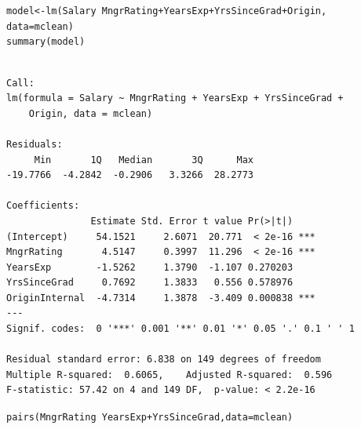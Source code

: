 \documentclass{beamer}\usepackage[]{graphicx}\usepackage[]{color}
\makeatletter
\newcommand{\hlopt}[1]{\textcolor[rgb]{1,0.894,0.769}{#1}}%
\newcommand{\hlstd}[1]{\textcolor[rgb]{1,0.894,0.769}{#1}}%
\newcommand{\hlkwb}[1]{\textcolor[rgb]{0.804,0.776,0.451}{#1}}%
\newcommand{\hlkwc}[1]{\textcolor[rgb]{0.78,0.941,0.545}{#1}}%
\newcommand{\hlkwd}[1]{\textcolor[rgb]{1,0.78,0.769}{#1}}%
\newenvironment{kframe}{%
 \def\at@end@of@kframe{}%
 \ifinner\ifhmode%
  \def\at@end@of@kframe{\end{minipage}}%
  \begin{minipage}{\columnwidth}%
 \fi\fi%
 \def\FrameCommand##1{\hskip\@totalleftmargin \hskip-\fboxsep
 \colorbox{shadecolor}{##1}\hskip-\fboxsep
     \hskip-\linewidth \hskip-\@totalleftmargin \hskip\columnwidth}%
 \MakeFramed {\advance\hsize-\width
   \@totalleftmargin\z@ \linewidth\hsize
   \@setminipage}}%
 {\par\unskip\endMakeFramed%
 \at@end@of@kframe}
\newenvironment{knitrout}{}{} %
\makeatother
\begin{document}
\begin{darkframes}
    \begin{frame}[fragile]%
      \fontsize{8}{8}\selectfont
\begin{knitrout}
\begin{kframe}
\begin{alltt}
\hlstd{model} \hlkwb{<-} \hlkwd{lm}\hlstd{(Salary} \hlopt{~} \hlstd{MngrRating} \hlopt{+} \hlstd{YearsExp} \hlopt{+} \hlstd{YrsSinceGrad} \hlopt{+} \hlstd{Origin,}
           \hlkwc{data}\hlstd{=mclean)}
\hlkwd{summary}\hlstd{(model)}
\end{alltt}
\begin{verbatim}

Call:
lm(formula = Salary ~ MngrRating + YearsExp + YrsSinceGrad + 
    Origin, data = mclean)

Residuals:
     Min       1Q   Median       3Q      Max 
-19.7766  -4.2842  -0.2906   3.3266  28.2773 

Coefficients:
               Estimate Std. Error t value Pr(>|t|)    
(Intercept)     54.1521     2.6071  20.771  < 2e-16 ***
MngrRating       4.5147     0.3997  11.296  < 2e-16 ***
YearsExp        -1.5262     1.3790  -1.107 0.270203    
YrsSinceGrad     0.7692     1.3833   0.556 0.578976    
OriginInternal  -4.7314     1.3878  -3.409 0.000838 ***
---
Signif. codes:  0 '***' 0.001 '**' 0.01 '*' 0.05 '.' 0.1 ' ' 1

Residual standard error: 6.838 on 149 degrees of freedom
Multiple R-squared:  0.6065,	Adjusted R-squared:  0.596 
F-statistic: 57.42 on 4 and 149 DF,  p-value: < 2.2e-16
\end{verbatim}
\end{kframe}
\end{knitrout}
    \end{frame}
    
    
    \begin{frame}[fragile]%
      \fontsize{9}{9}\selectfont
\begin{knitrout}
\begin{kframe}
\begin{alltt}
\hlkwd{pairs}\hlstd{(MngrRating} \hlopt{~} \hlstd{YearsExp} \hlopt{+} \hlstd{YrsSinceGrad,} \hlkwc{data}\hlstd{=mclean)}
\end{alltt}
\end{kframe}


\end{knitrout}
    \end{frame}
    

\end{darkframes}
\end{document}
